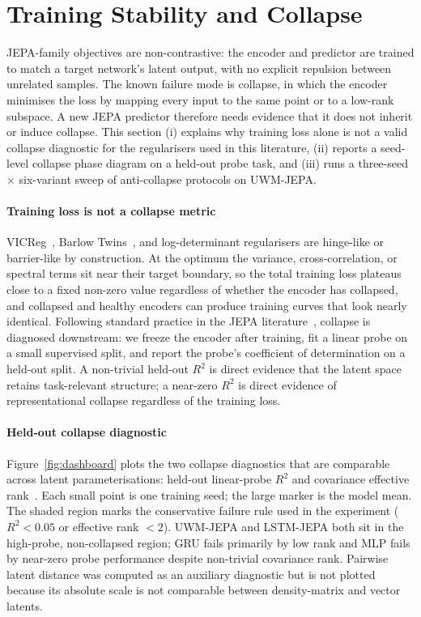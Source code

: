 \section{Training Stability and Collapse}
\label{sec:training}

JEPA-family objectives are non-contrastive: the encoder and predictor
are trained to match a target network's latent output, with no
explicit repulsion between unrelated samples. The known failure mode
is collapse, in which the encoder minimises the loss by mapping every
input to the same point or to a low-rank subspace. A new JEPA
predictor therefore needs evidence that it does not inherit or induce
collapse. This section (i) explains why training loss alone is not a
valid collapse diagnostic for the regularisers used in this
literature, (ii) reports a seed-level collapse phase diagram on a
held-out probe task, and (iii) runs a three-seed $\times$ six-variant
sweep of anti-collapse protocols on UWM-JEPA.

\paragraph{Training loss is not a collapse metric}
VICReg~\cite{bardes2022vicreg}, Barlow Twins~\cite{zbontar2021barlow},
and log-determinant regularisers are hinge-like or barrier-like by
construction. At the optimum the variance, cross-correlation, or
spectral terms sit near their target boundary, so the total training
loss plateaus close to a fixed non-zero value regardless of whether
the encoder has collapsed, and collapsed and healthy encoders can
produce training curves that look nearly identical. Following
standard practice in the JEPA
literature~\cite{assran2023ijepa,assran2024vjepa,caron2021emerging,chen2021exploring,grill2020bootstrap},
collapse is diagnosed downstream: we freeze the encoder after
training, fit a linear probe on a small supervised split, and report
the probe's coefficient of determination on a held-out split. A
non-trivial held-out $R^2$ is direct evidence that the latent space
retains task-relevant structure; a near-zero $R^2$ is direct evidence
of representational collapse regardless of the training loss.

\paragraph{Held-out collapse diagnostic}
Figure~\ref{fig:dashboard} plots the two collapse diagnostics that are
comparable across latent parameterisations: held-out linear-probe $R^2$
and covariance effective rank~\cite{alain2017understanding,roy2007effective}. Each small point is one training seed;
the large marker is the model mean. The shaded region marks the
conservative failure rule used in the experiment ($R^2<0.05$ or
effective rank $<2$). UWM-JEPA and LSTM-JEPA both sit in the
high-probe, non-collapsed region; GRU fails primarily by low rank and
MLP fails by near-zero probe performance despite non-trivial covariance
rank. Pairwise latent distance was computed as an auxiliary diagnostic
but is not plotted because its absolute scale is not comparable between
density-matrix and vector latents.


